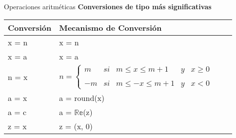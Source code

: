 \begin{frame}[fragile]{Operaciones aritméticas}
\textbf{Conversiones de tipo más significativas}
    \begin{table}[]
    \centering
    \label{Tabla_comparacion}
    \begin{tabular}{|l|l|l|l|}
    \hline
    Conversión      & Mecanismo de Conversión               \\ \hline
    x = n           & x = n                                 \\ \hline
    x = a           & x = a                                 \\ \hline
    n = x           & $  n = \left\{ \begin{array}{lcccc}
                 m &   si  & m \leq x \leq m+1   & y & x \geq 0 \\
             \\ -m &   si  & m \leq -x \leq m+1  & y & x < 0 
             \end{array}
   \right.$                                                 \\ \hline
    a = x           & a = round(x)                          \\ \hline
    a = c           & a = $\mathbb{Re}$(z)                   \\ \hline
    z = x           & z = (x, 0)                            \\ \hline              
    \end{tabular}
    
    \end{table}
\end{frame}